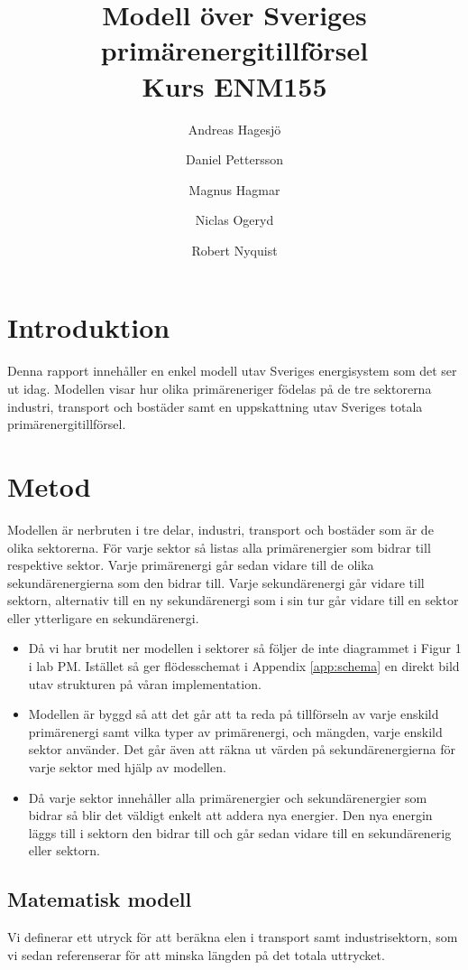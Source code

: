 \documentclass[a4paper,11pt,fleqn, titlepage]{article}
\author{Andreas Hagesjö \and Daniel Pettersson \and
Magnus Hagmar \and Niclas Ogeryd \and Robert Nyquist}
\title{Modell över Sveriges primärenergitillförsel \\ Kurs ENM155}
\begin{document}
\maketitle

\section{Introduktion}
Denna rapport innehåller en enkel modell utav Sveriges energisystem som det
ser ut idag. Modellen visar hur olika primäreneriger födelas på de tre
sektorerna industri, transport och bostäder samt en uppskattning utav
Sveriges totala primärenergitillförsel.


\section{Metod}
Modellen är nerbruten i tre delar, industri, transport och bostäder som är
de olika sektorerna. För varje sektor så listas alla primärenergier som
bidrar till respektive sektor. Varje primärenergi går sedan vidare till de
olika sekundärenergierna som den bidrar till. Varje sekundärenergi går
vidare till sektorn, alternativ till en ny sekundärenergi som i sin tur går
vidare till en sektor eller ytterligare en sekundärenergi.

\begin{itemize}
\item Då vi har brutit ner modellen i sektorer så följer de inte diagrammet
	i Figur 1 i lab PM. Istället så ger flödesschemat i Appendix
	\ref{app:schema} en direkt bild utav strukturen på våran
	implementation.


\item Modellen är byggd så att det går att ta reda på tillförseln av varje
	enskild primärenergi samt vilka typer av primärenergi, och mängden,
	varje enskild sektor använder. Det går även att räkna ut värden på
	sekundärenergierna för varje sektor med hjälp av modellen.

\item Då varje sektor innehåller alla primärenergier och sekundärenergier
	som bidrar så blir det väldigt enkelt att addera nya energier. Den nya
	energin läggs till i sektorn den bidrar till och går sedan vidare till
	en sekundärenerig eller sektorn.
\end{itemize}

\subsection{Matematisk modell}
Vi definerar ett utryck för att beräkna elen i transport samt
industrisektorn, som vi sedan referenserar för att minska längden på det
totala uttrycket.
\end{document}
